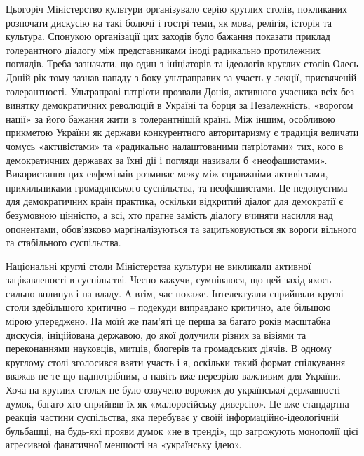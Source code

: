 Цьогоріч Міністерство культури організувало серію круглих столів, покликаних
розпочати дискусію на такі болючі і гострі теми, як мова, релігія, історія та
культура. Спонукою організації цих заходів було бажання показати приклад
толерантного діалогу між представниками іноді радикально протилежних поглядів.
Треба зазначати, що один з ініціаторів та ідеологів круглих столів Олесь Доній
рік тому зазнав нападу з боку ультраправих за участь у лекції, присвяченій
толерантності. Ультраправі патріоти прозвали Донія, активного учасника всіх без
винятку демократичних революцій в Україні та борця за Незалежність, «ворогом
нації» за його бажання жити в толерантнішій країні. Між іншим, особливою
прикметою України як держави конкурентного авторитаризму є традиція величати
чомусь «активістами» та «радикально налаштованими патріотами» тих, кого в
демократичних державах за їхні дії і погляди називали б «неофашистами».
Використання цих евфемізмів розмиває межу між справжніми активістами,
прихильниками громадянського суспільства, та неофашистами. Це недопустима для
демократичних країн практика, оскільки відкритий діалог для демократії є
безумовною цінністю, а всі, хто прагне замість діалогу вчиняти насилля над
опонентами, обов’язково маргіналізуються та зацитьковуються як вороги вільного
та стабільного суспільства.

Національні круглі столи Міністерства культури не викликали активної
зацікавленості в суспільстві. Чесно кажучи, сумніваюся, що цей захід якось
сильно вплинув і на владу. А втім, час покаже. Інтелектуали сприйняли круглі
столи здебільшого критично – подекуди виправдано критично, але більшою мірою
упереджено. На моїй же пам'яті це перша за багато років масштабна дискусія,
ініційована державою, до якої долучили різних за візіями та переконаннями
науковців, митців, блогерів та громадських діячів. В одному круглому столі
зголосився взяти участь і я, оскільки такий формат спілкування вважав не те що
надпотрібним, а навіть вже перезріло важливим для України. Хоча на круглих
столах не було озвучено ворожих до української державності думок, багато хто
сприйняв їх як «малоросійську диверсію». Це вже стандартна реакція частини
суспільства, яка перебуває у своїй інформаційно-ідеологічній бульбашці, на
будь-які прояви думок «не в тренді», що загрожують монополії цієї агресивної
фанатичної меншості на «українську ідею».

